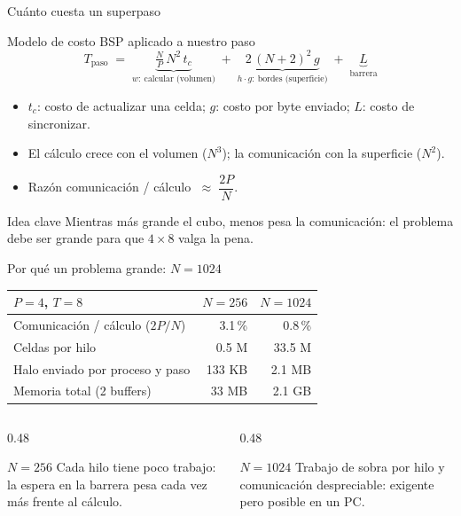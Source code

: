 \documentclass[aspectratio=169]{beamer}
\begin{document}
\begin{frame}{Cuánto cuesta un superpaso}
  \begin{block}{Modelo de costo BSP aplicado a nuestro paso}
    \[
      T_{\text{paso}} \;=\;
      \underbrace{\tfrac{N}{P}\,N^2\, t_c}_{w:\ \text{calcular (volumen)}}
      \;+\;
      \underbrace{2\,(N+2)^2\, g}_{h\cdot g:\ \text{bordes (superficie)}}
      \;+\;
      \underbrace{L}_{\text{barrera}}
    \]
  \end{block}
  \begin{itemize}
    \footnotesize
    \item $t_c$: costo de actualizar una celda; $g$: costo por byte enviado;
          $L$: costo de sincronizar.
    \item El cálculo crece con el \alert{volumen} ($N^3$); la comunicación con
          la \alert{superficie} ($N^2$).
    \item Razón comunicación / cálculo $\;\approx\; \dfrac{2P}{N}$.
  \end{itemize}
  \begin{alertblock}{Idea clave}
    \footnotesize
    Mientras más grande el cubo, menos pesa la comunicación: el problema debe
    ser grande para que $4\times8$ valga la pena.
  \end{alertblock}
\end{frame}

\begin{frame}{Por qué un problema grande: $N=1024$}
  \centering
  \footnotesize
  \begin{tabular}{lrr}
    \toprule
    $P=4$, $T=8$ & $N=256$ & $N=1024$ \\
    \midrule
    Comunicación / cálculo ($2P/N$) & 3.1\,\% & 0.8\,\% \\
    Celdas por hilo & 0.5 M & 33.5 M \\
    Halo enviado por proceso y paso & 133 KB & 2.1 MB \\
    Memoria total (2 buffers) & 33 MB & 2.1 GB \\
    \bottomrule
  \end{tabular}
  \vspace{4mm}
  \begin{columns}[T]
    \begin{column}{0.48\textwidth}
      \begin{block}{$N=256$}
        \footnotesize
        Cada hilo tiene poco trabajo: la espera en la barrera pesa cada vez
        más frente al cálculo.
      \end{block}
    \end{column}
    \begin{column}{0.48\textwidth}
      \begin{block}{$N=1024$}
        \footnotesize
        Trabajo de sobra por hilo y comunicación despreciable:
        \alert{exigente pero posible en un PC}.
      \end{block}
    \end{column}
  \end{columns}
\end{frame}
\end{document}
